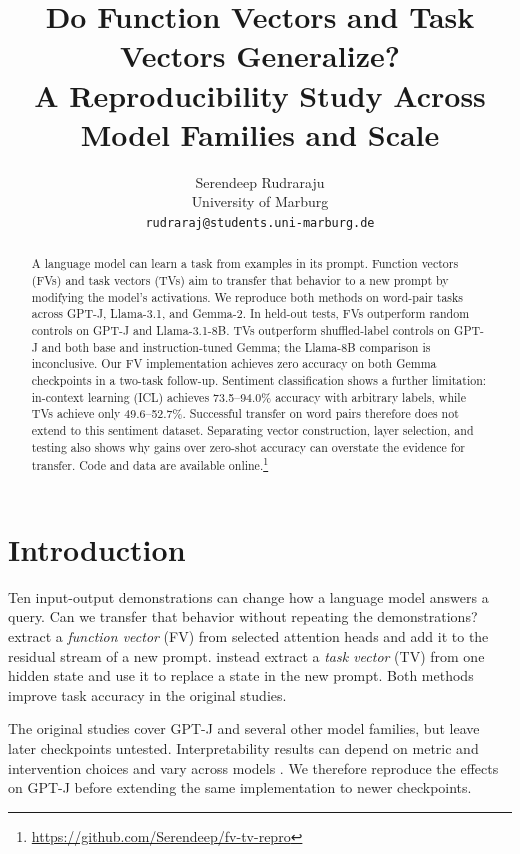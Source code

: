 \documentclass[11pt]{article}
\title{Do Function Vectors and Task Vectors Generalize? \\ A Reproducibility Study Across Model Families and Scale}
\author{Serendeep Rudraraju \\
  University of Marburg \\
  \texttt{rudraraj@students.uni-marburg.de}}
\begin{document}
\maketitle

\begin{abstract}
A language model can learn a task from examples in its prompt. Function vectors (FVs) and task vectors (TVs) aim to transfer that behavior to a new prompt by modifying the model's activations. We reproduce both methods on word-pair tasks across GPT-J, Llama-3.1, and Gemma-2. In held-out tests, FVs outperform random controls on GPT-J and Llama-3.1-8B. TVs outperform shuffled-label controls on GPT-J and both base and instruction-tuned Gemma; the Llama-8B comparison is inconclusive. Our FV implementation achieves zero accuracy on both Gemma checkpoints in a two-task follow-up. Sentiment classification shows a further limitation: in-context learning (ICL) achieves 73.5--94.0\% accuracy with arbitrary labels, while TVs achieve only 49.6--52.7\%. Successful transfer on word pairs therefore does not extend to this sentiment dataset. Separating vector construction, layer selection, and testing also shows why gains over zero-shot accuracy can overstate the evidence for transfer. Code and data are available online.\footnote{\url{https://github.com/Serendeep/fv-tv-repro}}
\end{abstract}

\section{Introduction}
\label{sec:intro}

Ten input-output demonstrations can change how a language model answers a query. Can we transfer that behavior without repeating the demonstrations? \citet{todd2024function} extract a \emph{function vector} (FV) from selected attention heads and add it to the residual stream of a new prompt. \citet{hendel2023incontext} instead extract a \emph{task vector} (TV) from one hidden state and use it to replace a state in the new prompt. Both methods improve task accuracy in the original studies.

The original studies cover GPT-J and several other model families, but leave later checkpoints untested. Interpretability results can depend on metric and intervention choices \citep{zhang2024towards} and vary across models \citep{yin2025which}. We therefore reproduce the effects on GPT-J before extending the same implementation to newer checkpoints.
\end{document}
